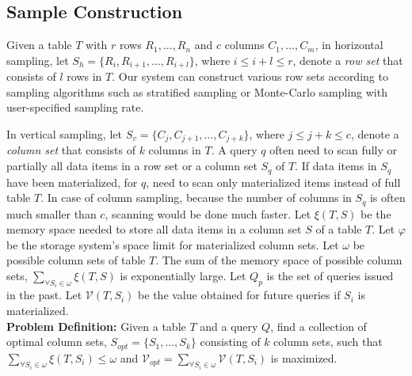 \documentclass{sig-alternate-05-2015}
\begin{document}
\subsection{Sample Construction}

Given a table $T$ with $r$ rows $R_1, ..., R_n$ and $c$ columns $C_1, ..., C_m$, 
in horizontal sampling, let $S_h=\{R_i, R_{i+1}, ..., R_{i+l}\}$, where $ i \leq i+l \leq r$, denote a \textit{row set}  that consists of $l$ rows in $T$. Our system can construct various row sets according to  sampling algorithms such as stratified sampling \cite{Chaudhuri:2007} or Monte-Carlo sampling with user-specified sampling rate.

In vertical sampling, let $S_v=\{C_j, C_{j+1}, ..., C_{j+k}\}$, where $ j \leq j+k \leq c$, denote a \textit{column set} that consists of $k$ columns in $T$. 
A query $q$ often need to scan fully or partially all data items in a row set or a column set $S_q$ of $T$. 
If data items in $S_q$ have been materialized, for $q$, need to scan only materialized items instead of full table $T$. 
In case of column sampling, because the number of columns in $S_q$ is often much smaller than $c$, scanning would be done much faster.
Let $\xi(T, S)$ be the memory space needed to store all data items in a column set $S$ of a table $T$.
Let $\varphi$ be the storage system's space limit for materialized column sets.
Let $\omega$ be possible column sets of table $T$. 
The sum of the memory space of possible column sets, $\sum_{\forall S_i \in \omega} \xi(T, S)$ is exponentially large.
Let $Q_p$ is the set of queries issued in the past.
Let $\mathcal{V}(T, S_i)$ be the value obtained for future queries if $S_i$ is materialized.\\

\noindent
\textbf{Problem Definition:}  Given a table $T$ and a query $Q$, find a collection of optimal column sets, $S_{opt} = \{S_1, ..., S_k\}$ consisting of $k$ column sets, such that $\sum_{\forall S_i \in \omega} \xi(T, S_i) \leq \omega $ and $\mathcal{V}_{opt} = \sum_{\forall S_i \in \omega} \mathcal{V}(T, S_i) $ is maximized.\\
\end{document}

